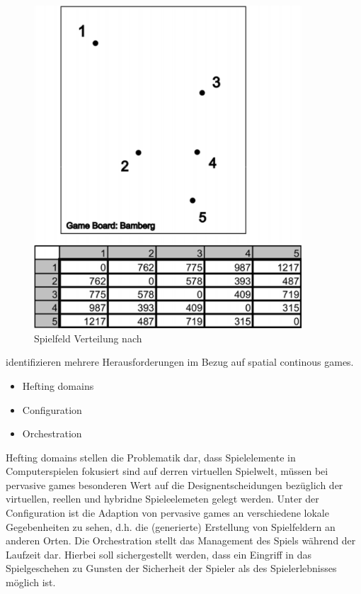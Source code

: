 \begin{figure}[H]
\begin{center}
\includegraphics[width=100mm]{images/ch3_img03b_distributed.png}
\caption{Spielfeld Verteilung nach \textcite{Kiefer.2007}}
\label{img:ch03_img02_flow}
\end{center}
\end{figure}

\citep{Benford.2005} identifizieren mehrere Herausforderungen im Bezug auf spatial continous games.

\begin{itemize}
\item Hefting domains
\item Configuration
\item Orchestration
\end{itemize}

Hefting domains stellen die Problematik dar, dass Spielelemente in Computerspielen fokusiert sind auf derren virtuellen Spielwelt, müssen bei pervasive games besonderen Wert auf die Designentscheidungen bezüglich der virtuellen, reellen und hybridne Spieleelemeten gelegt werden.
Unter der Configuration ist die Adaption von pervasive games an verschiedene lokale Gegebenheiten zu sehen, d.h. die (generierte) Erstellung von Spielfeldern an anderen Orten.
Die Orchestration stellt das Management des Spiels während der Laufzeit dar. Hierbei soll sichergestellt werden, dass ein Eingriff in das Spielgeschehen zu Gunsten der Sicherheit der Spieler als des Spielerlebnisses möglich ist.

